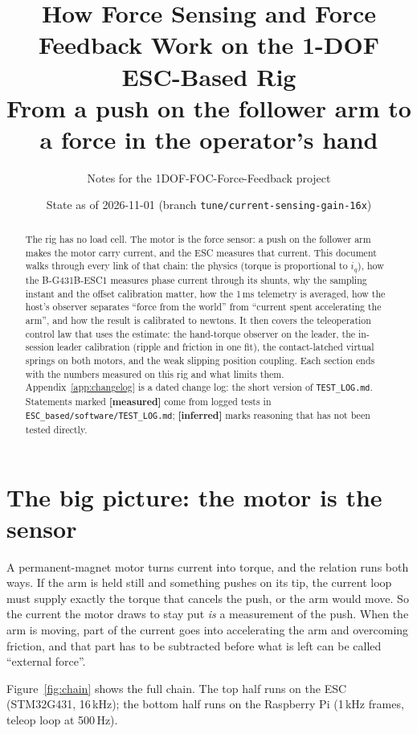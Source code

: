 \documentclass[11pt,a4paper]{article}
\title{How Force Sensing and Force Feedback Work on the 1-DOF ESC-Based Rig\\[4pt]
\large From a push on the follower arm to a force in the operator's hand}
\author{Notes for the 1DOF-FOC-Force-Feedback project}
\date{State as of 2026-11-01 (branch \texttt{tune/current-sensing-gain-16x})}
\newcommand{\iq}{i_q}
\newcommand{\file}[1]{\texttt{#1}}
\newcommand{\measured}{\textcolor{teal!70!black}{\textbf{[measured]}}}
\newcommand{\inferred}{\textcolor{orange!80!black}{\textbf{[inferred]}}}
\begin{document}
\maketitle

\begin{abstract}
The rig has no load cell. The motor is the force sensor: a push on the
follower arm makes the motor carry current, and the ESC measures that
current. This document walks through every link of that chain: the physics
(torque is proportional to $\iq$), how the B-G431B-ESC1 measures phase
current through its shunts, why the sampling instant and the offset
calibration matter, how the 1\,ms telemetry is averaged, how the host's
observer separates ``force from the world'' from ``current spent
accelerating the arm'', and how the result is calibrated to newtons. It
then covers the teleoperation control law that uses the estimate: the
hand-torque observer on the leader, the in-session leader calibration
(ripple and friction in one fit), the contact-latched virtual springs on
both motors, and the weak slipping position coupling. Each section ends
with the numbers measured on this rig and what limits them.
Appendix~\ref{app:changelog} is a dated change log: the short version of
\file{TEST\_LOG.md}.
Statements marked \measured{} come from logged tests in
\file{ESC\_based/software/TEST\_LOG.md}; \inferred{} marks reasoning that
has not been tested directly.
\end{abstract}

\tableofcontents
\bigskip

\section{The big picture: the motor is the sensor}

A permanent-magnet motor turns current into torque, and the relation runs
both ways. If the arm is held still and something pushes on its tip, the
current loop must supply exactly the torque that cancels the push, or the
arm would move. So the current the motor draws to stay put \emph{is} a
measurement of the push. When the arm is moving, part of the current goes
into accelerating the arm and overcoming friction, and that part has to be
subtracted before what is left can be called ``external force''.

Figure~\ref{fig:chain} shows the full chain. The top half runs on the ESC
(STM32G431, 16\,kHz); the bottom half runs on the Raspberry Pi (1\,kHz
frames, teleop loop at 500\,Hz).
\end{document}
